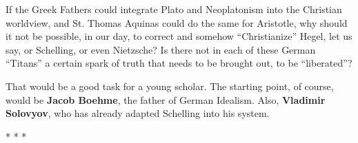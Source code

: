 \begin{quotex}
If the Greek Fathers could integrate Plato and Neoplatonism into the Christian worldview, and St. Thomas Aquinas could
do the same for Aristotle, why should it not be possible, in our day, to correct and somehow “Christianize” Hegel, let
us say, or Schelling, or even Nietzsche? Is there not in each of these German “Titans” a certain spark of truth that
needs to be brought out, to be “liberated”? 

\end{quotex}
That would be a good task for a young scholar. The starting point, of course, would be \textbf{Jacob Boehme}, the father
of German Idealism. Also, \textbf{Vladimir Solovyov}, who has already adapted Schelling into his system.


\begin{center}* * *\end{center}

